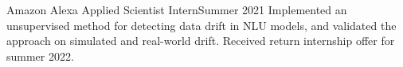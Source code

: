   {Amazon Alexa Applied Scientist Intern}{Summer 2021}{
Implemented an unsupervised method for detecting data drift in NLU models, and
validated the approach on simulated and real-world drift. Received return internship offer for summer 2022.}{}
\vspace{1mm}